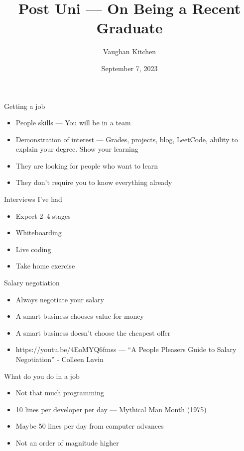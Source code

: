 \documentclass{beamer}
\title{Post Uni --- On Being a Recent Graduate}
\author{Vaughan Kitchen}
\date{September 7, 2023}
\begin{document}
\begin{frame}
\titlepage
\end{frame}

\begin{frame}{Getting a job}
\begin{itemize}
\item People skills --- You will be in a team
\item Demonstration of interest --- Grades, projects, blog, LeetCode, ability to explain your degree. Show your learning
\item They are looking for people who want to learn
\item They don't require you to know everything already
\end{itemize}
\end{frame}

\begin{frame}{Interviews I've had}
\begin{itemize}
\item Expect 2--4 stages
\item Whiteboarding
\item Live coding
\item Take home exercise
\end{itemize}
\end{frame}

\begin{frame}{Salary negotiation}
\begin{itemize}
\item Always negotiate your salary
\item A smart business chooses value for money
\item A smart business doesn't choose the cheapest offer
\item https://youtu.be/4EoMYQ6fmss --- ``A People Pleasers Guide to Salary Negotiation'' - Colleen Lavin
\end{itemize}
\end{frame}

\begin{frame}{What do you do in a job}
\begin{itemize}
\item Not that much programming
\item 10 lines per developer per day --- Mythical Man Month (1975)
\item Maybe 50 lines per day from computer advances
\item Not an order of magnitude higher
\end{itemize}
\end{frame}
\end{document}
